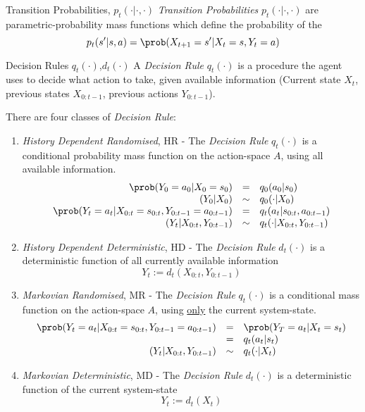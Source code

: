 \documentclass[11pt,a4paper]{article}
\begin{document}
  \begin{definition}{Transition Probabilities, $p_t(\cdot|\cdot,\cdot)$}
    \textit{Transition Probabilities} $p_t(\cdot|\cdot,\cdot)$ are parametric-probability mass functions which define the probability of the
    \[ p_t(s'|s,a)=\prob(X_{t+1}=s'|X_t=s,Y_t=a) \]
  \end{definition}

  \begin{definition}{Decision Rules $q_t(\cdot)$,$d_t(\cdot)$}
    A \textit{Decision Rule} $q_t(\cdot)$ is a procedure the agent uses to decide what action to take, given available information (Current state $X_t$, previous states $X_{0:t-1}$, previous actions $Y_{0:t-1}$).
    \par There are four classes of \textit{Decision Rule}:
    \begin{enumerate}
      \item \textit{History Dependent Randomised}, HR - The \textit{Decision Rule} $q_t(\cdot)$ is a conditional probability mass function on the action-space $A$, using all available information.
      \[\begin{array}{rcl}
        \prob(Y_0=a_0|X_0=s_0)&=&q_0(a_0|s_0)\\
        (Y_0|X_0)&\sim&q_0(\cdot|X_0)\\
        \prob(Y_t=a_t|X_{0:t}=s_{0:t},Y_{0:t-1}=a_{0:t-1})&=&q_t(a_t|s_{0:t},a_{0:t-1})\\
        (Y_t|X_{0:t},Y_{0:t-1})&\sim&q_t(\cdot|X_{0:t},Y_{0:t-1})
      \end{array}\]
      \item \textit{History Dependent Deterministic}, HD - The \textit{Decision Rule} $d_t(\cdot)$ is a deterministic function of all currently available information
      \[ Y_t:=d_t(X_{0:t},Y_{0:t-1}) \]
      \item \textit{Markovian Randomised}, MR - The \textit{Decision Rule} $q_t(\cdot)$ is a conditional mass function on the action-space $A$, using \underline{only} the current system-state.
      \[\begin{array}{rcl}
        \prob(Y_t=a_t|X_{0:t}=s_{0:t},Y_{0:t-1}=a_{0:t-1})&=&\prob(Y_T=a_t|X_t=s_t)\\
        &=&q_t(a_t|s_t)\\
        (Y_t|X_{0:t},Y_{0:t-1})&\sim&q_t(\cdot|X_t)
      \end{array}\]
      \item \textit{Markovian Deterministic}, MD - The \textit{Decision Rule} $d_t(\cdot)$ is a deterministic function of the current system-state
      \[ Y_t:=d_t(X_t) \]
    \end{enumerate}
  \end{definition}
\end{document}
